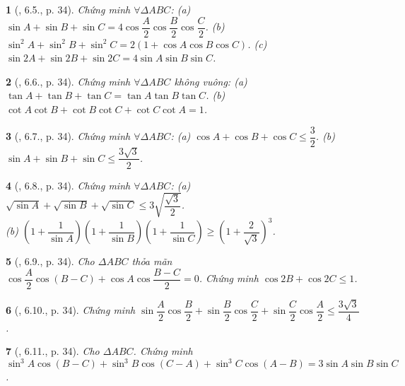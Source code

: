 \documentclass{article}
\newtheorem{baitoan}{}
\begin{document}
\begin{baitoan}[\cite{Hung_nang_cao_phat_trien_Toan_11_tap_1}, 6.5., p. 34]
	Chứng minh $\forall\Delta ABC$: (a) $\sin A + \sin B + \sin C = 4\cos\dfrac{A}{2}\cos\dfrac{B}{2}\cos\dfrac{C}{2}$. (b) $\sin^2A + \sin^2B + \sin^2C = 2(1 + \cos A\cos B\cos C)$. (c) $\sin2A + \sin2B + \sin2C = 4\sin A\sin B\sin C$.
\end{baitoan}

\begin{baitoan}[\cite{Hung_nang_cao_phat_trien_Toan_11_tap_1}, 6.6., p. 34]
	Chứng minh $\forall\Delta ABC$ không vuông: (a) $\tan A + \tan B + \tan C = \tan A\tan B\tan C$. (b) $\cot A\cot B + \cot B\cot C + \cot C\cot A = 1$.
\end{baitoan}

\begin{baitoan}[\cite{Hung_nang_cao_phat_trien_Toan_11_tap_1}, 6.7., p. 34]
	Chứng minh $\forall\Delta ABC$: (a) $\cos A + \cos B + \cos C\le\dfrac{3}{2}$. (b) $\sin A + \sin B + \sin C\le\dfrac{3\sqrt{3}}{2}$.
\end{baitoan}

\begin{baitoan}[\cite{Hung_nang_cao_phat_trien_Toan_11_tap_1}, 6.8., p. 34]
	Chứng minh $\forall\Delta ABC$: (a) $\sqrt{\sin A} + \sqrt{\sin B} + \sqrt{\sin C}\le3\sqrt{\dfrac{\sqrt{3}}{2}}$.\\(b) $\left(1 + \dfrac{1}{\sin A}\right)\left(1 + \dfrac{1}{\sin B}\right)\left(1 + \dfrac{1}{\sin C}\right)\ge\left(1 + \dfrac{2}{\sqrt{3}}\right)^3$.
\end{baitoan}

\begin{baitoan}[\cite{Hung_nang_cao_phat_trien_Toan_11_tap_1}, 6.9., p. 34]
	Cho $\Delta ABC$ thỏa mãn $\cos\dfrac{A}{2}\cos(B - C) + \cos A\cos\dfrac{B - C}{2} = 0$. Chứng minh $\cos2B + \cos2C\le1$.
\end{baitoan}

\begin{baitoan}[\cite{Hung_nang_cao_phat_trien_Toan_11_tap_1}, 6.10., p. 34]
	Chứng minh $\sin\dfrac{A}{2}\cos\dfrac{B}{2} + \sin\dfrac{B}{2}\cos\dfrac{C}{2} + \sin\dfrac{C}{2}\cos\dfrac{A}{2}\le\dfrac{3\sqrt{3}}{4}$.
\end{baitoan}

\begin{baitoan}[\cite{Hung_nang_cao_phat_trien_Toan_11_tap_1}, 6.11., p. 34]
	Cho $\Delta ABC$. Chứng minh $\sin^3A\cos(B - C) + \sin^3B\cos(C - A) + \sin^3C\cos(A - B) = 3\sin A\sin B\sin C$.
\end{baitoan}
\end{document}
